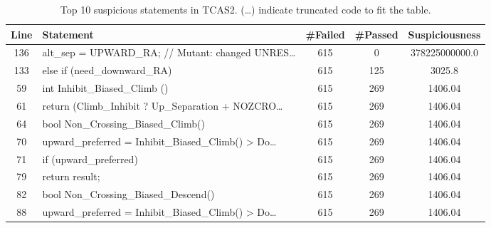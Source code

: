 \documentclass[conference]{IEEEtran}
\begin{document}
\label{appendix:TCAS2}
\begin{table}[h]
    \centering
    \footnotesize
    \begin{tabular}{|c|p{3cm}|c|c|c|}
        \hline
        \textbf{Line} & \textbf{Statement} & \#Failed & \#Passed & \textbf{Suspiciousness} \\
        \hline
        136 & alt\_sep = UPWARD\_RA; // Mutant: changed UNRES\dots & 615 & 0   & 378225000000.0 \\
        133 & else if (need\_downward\_RA)               & 615 & 125 & 3025.8 \\
        59  & int Inhibit\_Biased\_Climb ()               & 615 & 269 & 1406.04 \\
        61  & return (Climb\_Inhibit ? Up\_Separation + NOZCRO\dots & 615 & 269 & 1406.04 \\
        64  & bool Non\_Crossing\_Biased\_Climb()          & 615 & 269 & 1406.04 \\
        70  & upward\_preferred = Inhibit\_Biased\_Climb() > Do\dots & 615 & 269 & 1406.04 \\
        71  & if (upward\_preferred)                      & 615 & 269 & 1406.04 \\
        79  & return result;                             & 615 & 269 & 1406.04 \\
        82  & bool Non\_Crossing\_Biased\_Descend()         & 615 & 269 & 1406.04 \\
        88  & upward\_preferred = Inhibit\_Biased\_Climb() > Do\dots & 615 & 269 & 1406.04 \\
        \hline
    \end{tabular}
    \caption{Top 10 suspicious statements in TCAS2. (\dots) indicate truncated code to fit the table.}
\end{table}
\end{document}
